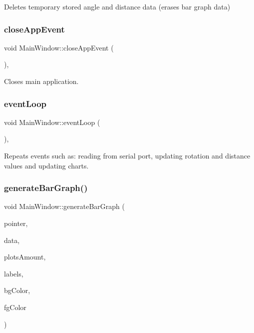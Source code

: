 Deletes temporary stored angle and distance data (erases bar graph data) 

\mbox{\label{class_main_window_aa23e4e2f222120878dc47b594292bb8c}} 
\subsubsection{close\+App\+Event}
{\footnotesize\ttfamily void Main\+Window\+::close\+App\+Event (\begin{DoxyParamCaption}{ }\end{DoxyParamCaption})\hspace{0.3cm}{\ttfamily [private]}, {\ttfamily [slot]}}



Closes main application. 

\mbox{\label{class_main_window_a92ea4484e5fd9b2d41fe08d2aef4c459}} 
\subsubsection{event\+Loop}
{\footnotesize\ttfamily void Main\+Window\+::event\+Loop (\begin{DoxyParamCaption}{ }\end{DoxyParamCaption})\hspace{0.3cm}{\ttfamily [private]}, {\ttfamily [slot]}}



Repeats events such as\+: reading from serial port, updating rotation and distance values and updating charts. 

\mbox{\label{class_main_window_aa7a185d6aecfa15957d6fbfa0c42330b}} 
\subsubsection{generate\+Bar\+Graph()}
{\footnotesize\ttfamily void Main\+Window\+::generate\+Bar\+Graph (\begin{DoxyParamCaption}\item[{Q\+Custom\+Plot $\ast$}]{pointer,  }\item[{const Q\+Vector$<$ double $>$ \&}]{data,  }\item[{const quint32 \&}]{plots\+Amount,  }\item[{const Q\+Vector$<$ Q\+String $>$ \&}]{labels,  }\item[{const Q\+Color \&}]{bg\+Color,  }\item[{const Q\+Color \&}]{fg\+Color }\end{DoxyParamCaption})\hspace{0.3cm}{\ttfamily [private]}}



